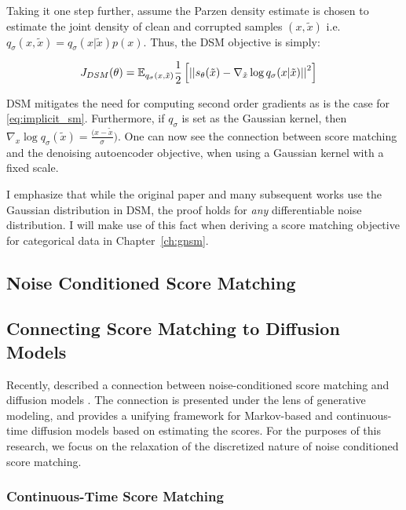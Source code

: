Taking it one step further, assume the Parzen density estimate is chosen to estimate the joint density of clean and corrupted samples $(x, \tilde{x})$ i.e. $q_{\sigma}(x, \tilde{x}) = q_{\sigma}(x | \tilde{x} ) p(x) $. Thus, the DSM objective is simply:

\begin{align}
\label{eq:denoising_sm}
    J_{DSM}(\theta) &= \mathbb{E}_{q_{\sigma}(x, \tilde{x})} \frac{1}{2} \left[ { \left|\left| {s_\theta(\tilde{x}) - \nabla_{\tilde{x}} \log q_{\sigma}(x | \tilde{x}) } \right|\right|^2 } \right]
\end{align}

DSM mitigates the need for computing second order gradients as is the case for \ref{eq:implicit_sm}. Furthermore, if $q_{\sigma}$ is set as the Gaussian kernel, then $\nabla_x \log q_{\sigma}(\tilde{x}) = \frac{(x - \tilde{x}}{\sigma})$. One can now see the connection between score matching and the denoising autoencoder objective, when using a Gaussian kernel with a fixed scale.

I emphasize that while the original paper and many subsequent works  use the Gaussian distribution in DSM, the proof holds for \textit{any} differentiable noise distribution.
I will make use of this fact when deriving a score matching objective for categorical data in Chapter~\ref{ch:gnsm}.

\subsection{Noise Conditioned Score Matching}

\subsection{Connecting Score Matching to Diffusion Models}
Recently,  described a connection between noise-conditioned score matching and diffusion models . The connection is presented under the lens of generative modeling, and provides a unifying framework for Markov-based and continuous-time diffusion models based on estimating the scores. 
For the purposes of this research, we focus on the relaxation of the discretized nature of noise conditioned score matching.

\subsubsection*{Continuous-Time Score Matching}


